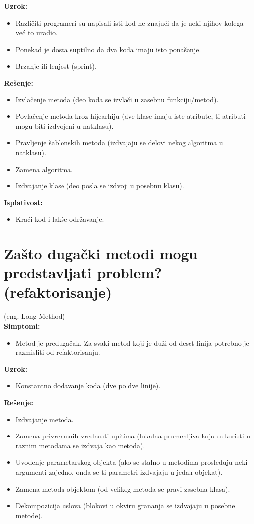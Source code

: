 \documentclass[a4paper]{article}
\begin{document}
  \noindent \textbf{Uzrok:} 
  \begin{itemize}
    \item Različiti programeri su napisali isti kod ne znajući da je neki njihov kolega već
          to uradio.
    \item Ponekad je dosta suptilno da dva koda imaju isto ponašanje.
    \item Brzanje ili lenjost (sprint).
  \end{itemize}

  \noindent \textbf{Rešenje:} 
  \begin{itemize}
    \item Izvlačenje metoda (deo koda se izvlači u zasebnu funkciju/metod).
    \item Povlačenje metoda kroz hijearhiju (dve klase imaju iste atribute, ti atributi
          mogu biti izdvojeni u natklasu).
    \item Pravljenje šablonskih metoda (izdvajaju se delovi nekog algoritma u natklasu).
    \item Zamena algoritma.
    \item Izdvajanje klase (deo posla se izdvoji u posebnu klasu).
  \end{itemize}

  \noindent \textbf{Isplativost:} 
  \begin{itemize}
    \item Kraći kod i lakše održavanje.
  \end{itemize}

\section{Zašto dugački metodi mogu predstavljati problem? (refaktorisanje)}
  (eng. Long Method)\\
  \textbf{Simptomi:}
  \begin{itemize}
    \item Metod je predugačak. Za svaki metod koji je duži od deset linija potrebno je
          razmisliti od refaktorisanju.
  \end{itemize}

  \noindent \textbf{Uzrok:} 
  \begin{itemize}
    \item Konstantno dodavanje koda (dve po dve linije).
  \end{itemize}

  \noindent \textbf{Rešenje:} 
  \begin{itemize}
    \item Izdvajanje metoda.
    \item Zamena privremenih vrednosti upitima (lokalna promenljiva koja se koristi u
          raznim metodama se izdvaja kao metoda).
    \item Uvođenje parametarskog objekta (ako se stalno u metodima prosleđuju neki argumenti zajedno,
          onda se ti parametri izdvajaju u jedan objekat).
    \item Zamena metoda objektom (od velikog metoda se pravi zasebna klasa).
    \item Dekompozicija uslova (blokovi u okviru grananja se izdvajaju u posebne metode).
  \end{itemize}
\end{document}
